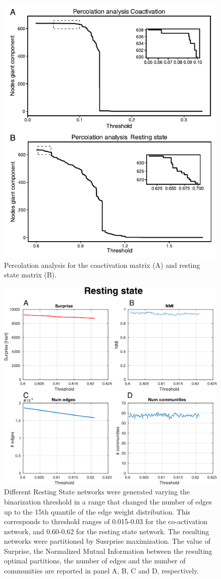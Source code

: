 \begin{figure}[htb!]
\centering
\includegraphics[width=0.7\linewidth]{images/figure_8_percolation_analysis_compressed.pdf}
\caption{Percolation analysis for the coactivation matrix (A) and resting state matrix (B).}
\label{fig:figure_8_percolation_analysis}
\end{figure}

\begin{figure}[htb!]
\centering
\includegraphics[width=0.7\linewidth]{images/resting_state_study_threshold.pdf}
\caption{Different Resting State networks were generated varying the binarization threshold in a range that changed the number of edges up to the 15th quantile of the edge weight distribution. This corresponds to threshold ranges of 0.015-0.03 for the co-activation network, and 0.60-0.62 for the resting state network. The resulting networks were partitioned by Susrprise maximization. The value of Surprise, the Normalized Mutual Information between the resulting optimal partitions, the number of edges and the number of communities are reported in panel A, B, C and D, respectively.}
\label{fig:figure_9_rs_threshold_study}
\end{figure}

